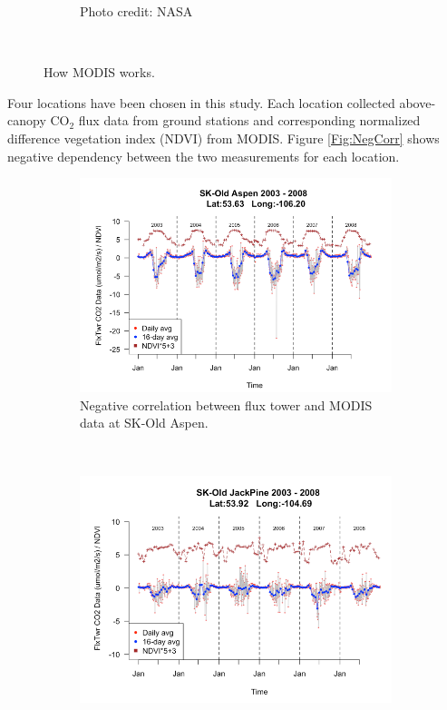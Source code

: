 \documentclass{article}
\begin{document}
\begin{figure}[!ht]
\begin{subfigure}[ht]{0.37\textwidth}
        \caption{Photo credit: NASA}
    \end{subfigure}
        ~ %
    \caption{How MODIS works.}\label{Fig:MODIS}
\end{figure}

Four locations have been chosen in this study.
Each location collected above-canopy CO$_2$ flux data from ground stations and corresponding normalized difference vegetation index (NDVI) from MODIS. Figure \ref{Fig:NegCorr} shows negative dependency between the two measurements for each location. 

\begin{figure}[ht]
    \centering
    \begin{subfigure}[ht]{0.45\textwidth}
        \includegraphics[width=\textwidth]{OAP_plot_together.png}
        \caption{Negative correlation between flux tower and MODIS data at SK-Old Aspen.}
        \label{Fig:NegCorr_OAP}
    \end{subfigure}
    ~ %
    \begin{subfigure}[ht]{0.45\textwidth}
        \includegraphics[width=\textwidth]{OJP_plot_together.png}

\end{subfigure}
\end{figure}
\end{document}
